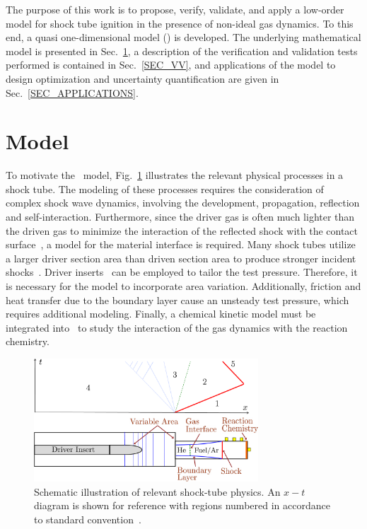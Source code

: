 	The purpose of this work is to propose, verify, validate, and apply a low-order model for shock tube ignition in the presence of non-ideal gas dynamics. To this end, a quasi one-dimensional model (\stnshk) is developed. The underlying mathematical model is presented in Sec.~\ref{SEC_MODEL}, a description of the verification and validation tests performed is contained in Sec.~\ref{SEC_VV}, and applications of the model to design optimization and uncertainty quantification are given in Sec.~\ref{SEC_APPLICATIONS}.
\section{Model}\label{SEC_MODEL}

To motivate the \stnshk\ model, Fig.~\ref{FIG_STPHYS} illustrates the relevant physical processes in a shock tube. The modeling of these processes requires the consideration of complex shock wave dynamics, involving the development, propagation, reflection and self-interaction. Furthermore, since the driver gas is often much lighter than the driven gas to minimize the interaction of the reflected shock with the contact surface~\cite{HANDBOOK_OF_SHOCKWAVES}, a model for the material interface is required. Many shock tubes utilize a larger driver section area than driven section area to produce stronger incident shocks~\cite{ALPHER_JFM58}. Driver inserts~\cite{HONG_PANG_VASU_DAVIDSON_HANSON_SW2009} can be employed to tailor the test pressure. Therefore, it is necessary for the model to incorporate area variation. Additionally, friction and heat transfer due to the boundary layer cause an unsteady test pressure, which requires additional modeling. Finally, a chemical kinetic model must be integrated into \stnshk\ to study the interaction of the gas dynamics with the reaction chemistry. 

\begin{figure}[!ht!]
	\begin{center}
		\includegraphics[width=84mm]{shockTubePhysics}
	\end{center}
	\caption{\label{FIG_STPHYS}Schematic illustration of relevant shock-tube physics. An $x-t$ diagram is shown for reference with regions numbered in accordance to standard convention~\cite{HANDBOOK_OF_SHOCKWAVES}.}
\end{figure}

